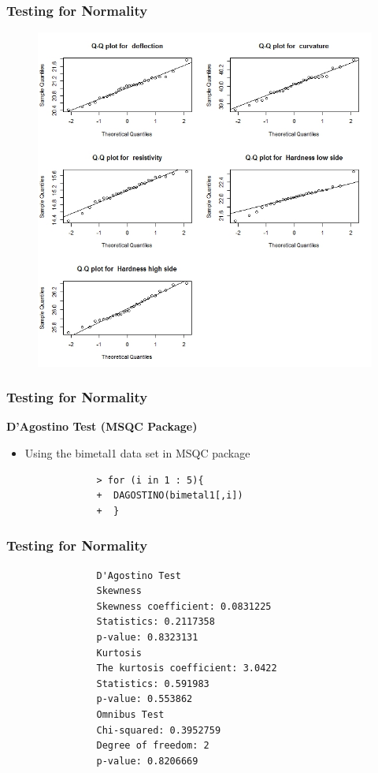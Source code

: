 \documentclass{beamer}
\begin{document}
\begin{frame}[fragile]
\frametitle{Testing for Normality}
\begin{figure}[h!]
\centering
\includegraphics[width=0.8\linewidth]{images/MSQC-bimetal1qq}
\end{figure}
\end{frame}
\begin{frame}[fragile]
\frametitle{Testing for Normality}
\noindent	\textbf{D'Agostino Test (MSQC Package)}
			\begin{itemize}
				\item Using the bimetal1 data set in MSQC package
			\end{itemize}
			\begin{framed}
				\begin{verbatim}
				> for (i in 1 : 5){
				+  DAGOSTINO(bimetal1[,i])
				+  }
			\end{verbatim}
			\end{framed}
\end{frame}
				\begin{frame}[fragile]
				\frametitle{Testing for Normality}
				\begin{framed}
				\begin{verbatim}
				D'Agostino Test
				Skewness
				Skewness coefficient: 0.0831225 
				Statistics: 0.2117358 
				p-value: 0.8323131 
				Kurtosis
				The kurtosis coefficient: 3.0422 
				Statistics: 0.591983 
				p-value: 0.553862 
				Omnibus Test
				Chi-squared: 0.3952759 
				Degree of freedom: 2
				p-value: 0.8206669 
				\end{verbatim}
			\end{framed}
				\end{frame}
\end{document}
